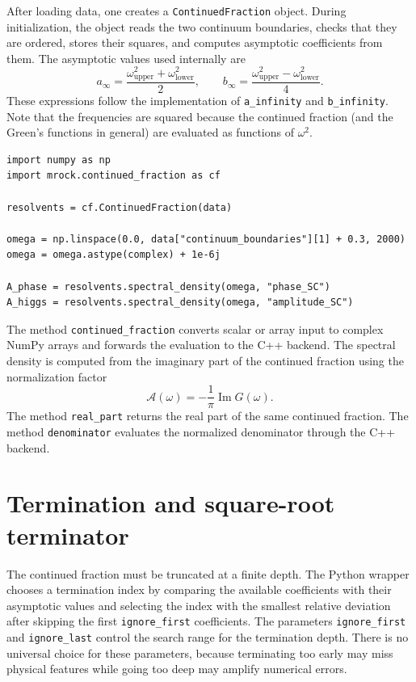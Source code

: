 \documentclass[11pt]{article}
\begin{document}
After loading data, one creates a \texttt{ContinuedFraction} object. 
During initialization, the object reads the two continuum boundaries, checks that they are ordered, stores their squares, and computes asymptotic coefficients from them. 
The asymptotic values used internally are
$$
a_\infty = \frac{\omega_\mathrm{upper}^2+\omega_\mathrm{lower}^2}{2},
  \qquad
  b_\infty = \frac{\omega_\mathrm{upper}^2-\omega_\mathrm{lower}^2}{4}.
$$
These expressions follow the implementation of \texttt{a\_infinity} and \texttt{b\_infinity}. 
Note that the frequencies are squared because the continued fraction (and the Green's functions in general) are evaluated as functions of $\omega^2$.

\begin{lstlisting}
import numpy as np
import mrock.continued_fraction as cf

resolvents = cf.ContinuedFraction(data)

omega = np.linspace(0.0, data["continuum_boundaries"][1] + 0.3, 2000)
omega = omega.astype(complex) + 1e-6j

A_phase = resolvents.spectral_density(omega, "phase_SC")
A_higgs = resolvents.spectral_density(omega, "amplitude_SC")
\end{lstlisting}

The method \texttt{continued\_fraction} converts scalar or array input to complex NumPy arrays and forwards the evaluation to the C++ backend. 
The spectral density is computed from the imaginary part of the continued fraction using the normalization factor
$$
\mathcal{A}(\omega) = -\frac{1}{\pi}\operatorname{Im} G(\omega).
$$
The method \texttt{real\_part} returns the real part of the same continued fraction. 
The method \texttt{denominator} evaluates the normalized denominator through the C++ backend.

\section{Termination and square-root terminator}

The continued fraction must be truncated at a finite depth. 
The Python wrapper chooses a termination index by comparing the available coefficients with their asymptotic values and selecting the index with the smallest relative deviation after skipping the first \texttt{ignore\_first} coefficients. 
The parameters \texttt{ignore\_first} and \texttt{ignore\_last} control the search range for the termination depth. 
There is no universal choice for these parameters, because terminating too early may miss physical features while going too deep may amplify numerical errors. 
\end{document}
